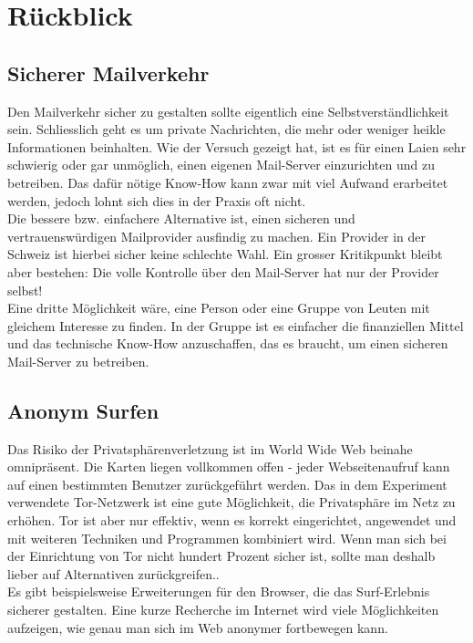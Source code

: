\section{Rückblick}

\subsection{Sicherer Mailverkehr}
Den Mailverkehr sicher zu gestalten sollte eigentlich eine Selbstverständlichkeit sein. Schliesslich geht es um private Nachrichten, die mehr oder weniger heikle Informationen beinhalten.
Wie der Versuch gezeigt hat, ist es für einen Laien sehr schwierig oder gar unmöglich, einen eigenen Mail-Server einzurichten und zu betreiben.
Das dafür nötige Know-How kann zwar mit viel Aufwand erarbeitet werden, jedoch lohnt sich dies in der Praxis oft nicht.
\\
Die bessere bzw. einfachere Alternative ist, einen sicheren und vertrauenswürdigen Mailprovider ausfindig zu machen.
Ein Provider in der Schweiz ist hierbei sicher keine schlechte Wahl.
Ein grosser Kritikpunkt bleibt aber bestehen: Die volle Kontrolle über den Mail-Server hat nur der Provider selbst!
\\
Eine dritte Möglichkeit wäre, eine Person oder eine Gruppe von Leuten mit gleichem Interesse zu finden. In der Gruppe ist es einfacher die finanziellen Mittel und das technische Know-How anzuschaffen, das es braucht, um einen sicheren Mail-Server zu betreiben.

\subsection{Anonym Surfen}
Das Risiko der Privatsphärenverletzung ist im World Wide Web beinahe omnipräsent.
Die Karten liegen vollkommen offen - jeder Webseitenaufruf kann auf einen bestimmten Benutzer zurückgeführt werden.
Das in dem Experiment verwendete Tor-Netzwerk ist eine gute Möglichkeit, die Privatsphäre im Netz zu erhöhen.
Tor ist aber nur effektiv, wenn es korrekt eingerichtet, angewendet und mit weiteren Techniken und Programmen kombiniert wird.
Wenn man sich bei der Einrichtung von Tor nicht hundert Prozent sicher ist, sollte man deshalb lieber auf Alternativen zurückgreifen..
\\
Es gibt beispielsweise Erweiterungen für den Browser, die das Surf-Erlebnis sicherer gestalten. Eine kurze Recherche im Internet wird viele Möglichkeiten aufzeigen, wie genau man sich im Web anonymer fortbewegen kann.

